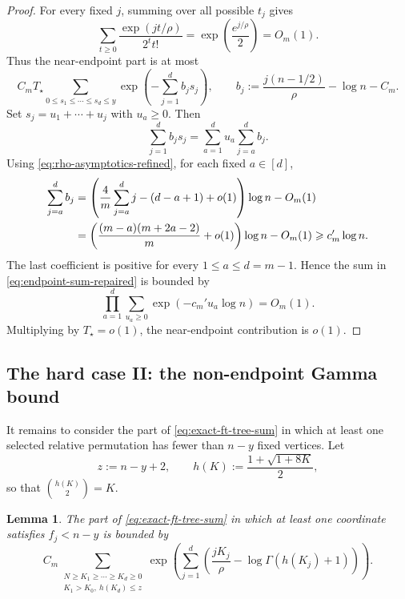 \documentclass[10pt,a4paper]{amsart}
\newtheorem{lemma}[theorem]{Lemma}
\renewcommand\le{\leqslant}
\renewcommand\ge{\geqslant}
\begin{document}
\begin{proof}
For every fixed $j$, summing over all possible $t_j$ gives
\[
        \sum_{t\ge0}\frac{\exp(jt/\rho)}{2^t t!}
        =\exp\left(\frac{e^{j/\rho}}2\right)=O_m(1).
\]
Thus the near-endpoint part is at most
\begin{equation}\label{eq:endpoint-sum-repaired}
        C_mT_\star
        \sum_{0\le s_1\le\cdots\le s_d\le y}
        \exp\left(-\sum_{j=1}^d b_js_j\right),
        \qquad
        b_j:=\frac{j(n-1/2)}\rho-\log n-C_m .
\end{equation}
Set $s_j=u_1+\cdots+u_j$ with $u_a\ge0$. Then
\[
        \sum_{j=1}^d b_js_j
        =\sum_{a=1}^d u_a\sum_{j=a}^d b_j .
\]
Using \eqref{eq:rho-asymptotics-refined}, for each fixed $a\in[d]$,
\begin{align}\label{eq:suffix-positive-repaired}
        \sum_{j=a}^d b_j
        &=\left(\frac4m\sum_{j=a}^d j-(d-a+1)+o(1)\right)\log n-O_m(1) \\
        &=\left(\frac{(m-a)(m+2a-2)}m+o(1)\right)\log n-O_m(1)
          \ge c_m'\log n . \notag
\end{align}
The last coefficient is positive for every $1\le a\le d=m-1$. Hence the sum in \eqref{eq:endpoint-sum-repaired} is bounded by
\[
        \prod_{a=1}^d\sum_{u_a\ge0}\exp(-c_m'u_a\log n)=O_m(1).
\]
Multiplying by $T_\star=o(1)$, the near-endpoint contribution is $o(1)$.
\end{proof}



\subsection{The hard case II: the non-endpoint Gamma bound}\label{subsec:hard_regime_non}

It remains to consider the part of \eqref{eq:exact-ft-tree-sum} in which at least one selected relative permutation has fewer than $n-y$ fixed vertices. Let
\[
        z:=n-y+2,
        \qquad
        h(K):=\frac{1+\sqrt{1+8K}}2,
\]
so that $\binom{h(K)}2=K$.

\begin{lemma}\label{lem:nonendpoint-gamma-reduction}
The part of \eqref{eq:exact-ft-tree-sum} in which at least one coordinate satisfies $f_j<n-y$ is bounded by
\begin{equation}\label{eq:nonendpoint-gamma-sum}
        C_m\sum_{\substack{N\ge K_1\ge\cdots\ge K_d\ge0\\ K_1>K_0,\ h(K_d)\le z}}
        \exp\left(\sum_{j=1}^d\left(
        \frac{jK_j}\rho-\log\Gamma(h(K_j)+1)\right)\right).
\end{equation}
\end{lemma}
\end{document}
